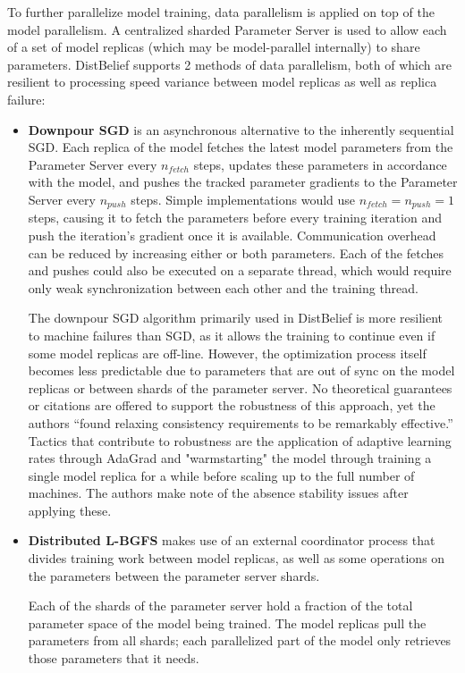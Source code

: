 To further parallelize model training, data parallelism is applied on top of the model parallelism. A centralized sharded Parameter Server is used to allow each of a set of model replicas (which may  be model-parallel internally) to share parameters. DistBelief supports 2 methods of data parallelism, both of which are resilient to processing speed variance between model replicas as well as replica failure:
\begin{itemize}
	\item \textbf{Downpour SGD} is an asynchronous alternative to the inherently sequential SGD. Each replica of the model fetches the latest model parameters from the Parameter Server every $n_{fetch}$ steps, updates these parameters in accordance with the model, and pushes the tracked parameter gradients to the Parameter Server every $n_{push}$ steps. Simple implementations would use $n_{fetch} = n_{push} = 1$ steps, causing it to fetch the parameters before every training iteration and push the iteration’s gradient once it is available. Communication overhead can be reduced by increasing either or both parameters. Each of the fetches and pushes could also be executed on a separate thread, which would require only weak synchronization between each other and the training thread.
	
	The downpour SGD algorithm primarily used in DistBelief is more resilient to machine failures than SGD, as it allows the training to continue even if some model replicas are off-line. However, the optimization process itself becomes less predictable due to parameters that are out of sync on the model replicas or between shards of the parameter server. No theoretical guarantees or citations are offered to support the robustness of this approach, yet the authors “found relaxing consistency requirements to be remarkably effective.” Tactics that contribute to robustness are the application of adaptive learning rates through AdaGrad\citep{Duchi2011} and "warmstarting" the model through training a single model replica for a while before scaling up to the full number of machines. The authors make note of the absence stability issues after applying these.
	\item \textbf{Distributed L-BGFS} makes use of an external coordinator process that divides training work between model replicas, as well as some operations on the parameters between the parameter server shards.
	
	Each of the shards of the parameter server hold a fraction of the total parameter space of the model being trained. The model replicas pull the parameters from all shards; each parallelized part of the model only retrieves those parameters that it needs.
	

\end{itemize}
